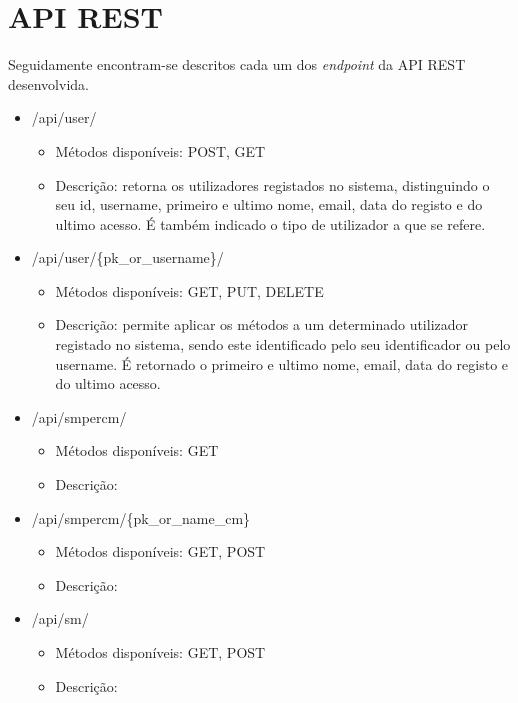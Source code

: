 \chapter{\acl{API} \acs{REST}}
\label{espcifAPIREST}

Seguidamente encontram-se descritos cada um dos \textit{endpoint} da \ac{API} \ac{REST} desenvolvida.  

\begin{itemize}
	\item /api/user/
		\begin{itemize}
			\item Métodos disponíveis: POST, GET
			\item Descrição: retorna os utilizadores registados no sistema, distinguindo o seu id, username, primeiro e ultimo nome, email, data do registo e do ultimo acesso. É também indicado o tipo de utilizador a que se refere. 
		\end{itemize}

	
	\item /api/user/\{pk\_or\_username\}/
		\begin{itemize}
			\item Métodos disponíveis: GET, PUT, DELETE
			\item Descrição: permite aplicar os métodos a um determinado utilizador registado no sistema, sendo este identificado pelo seu identificador ou pelo username. É retornado o primeiro e ultimo nome, email, data do registo e do ultimo acesso.
		\end{itemize}
		
	\item /api/smpercm/
	\begin{itemize}
		\item Métodos disponíveis: GET
		\item Descrição: 
	\end{itemize}
	
	
	
	\item /api/smpercm/\{pk\_or\_name\_cm\}
	\begin{itemize}
		\item Métodos disponíveis: GET, POST
		\item Descrição: 
	\end{itemize}
	
	
	\item /api/sm/
	\begin{itemize}
		\item Métodos disponíveis: GET, POST
		\item Descrição: 
	\end{itemize}
	

\end{itemize}
